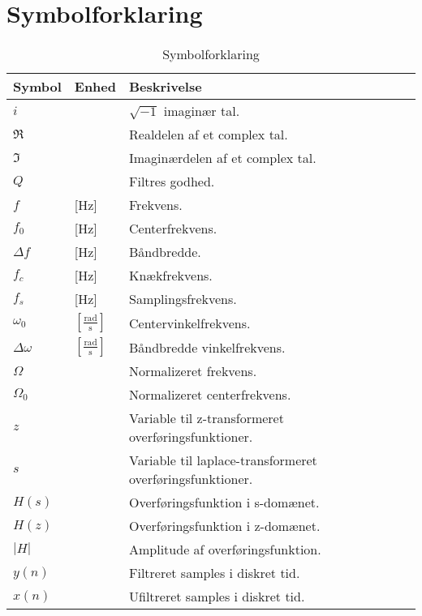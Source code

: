 \chapter{Symbolforklaring} \label{bilag:symbol}

\begin{table}[h!]
\centering
\caption{Symbolforklaring}
\label{tab:symboler}
\begin{threeparttable}
\begin{tabular}{l l l}
\toprule
\multicolumn{1}{l}{Symbol}       &
\multicolumn{1}{l}{Enhed}        &
\multicolumn{1}{l}{Beskrivelse}  \\ 
\midrule
$i$\tnote{*}		&					& $\sqrt{-1}$ imaginær tal.	\\
$\Re$\tnote{*}		&					& Realdelen af et complex tal.	\\
$\Im$\tnote{*}		&					& Imaginærdelen af et complex tal.	\\
$Q$\tnote{*}        &                   & Filtres godhed.\\
$f$					&	[\si{\hertz}]	& Frekvens.	\\
$f_0$				&	[\si{\hertz}]	& Centerfrekvens.	\\
$\Delta f$			&	[\si{\hertz}]	& Båndbredde.	\\
$f_c$				&	[\si{\hertz}]	& Knækfrekvens.	\\
$f_s$				&	[\si{\hertz}]	& Samplingsfrekvens.	\\
$\omega_0$			&	$[\frac{\si{\radian}}{\si{\second}}]$	& Centervinkelfrekvens.	\\
$\Delta \omega$		&	$[\frac{\si{\radian}}{\si{\second}}]$	& Båndbredde vinkelfrekvens.	\\
$\Omega$\tnote{*}	&					& Normalizeret frekvens.	\\
$\Omega_0$\tnote{*}	&					& Normalizeret centerfrekvens.	\\
$z$\tnote{*}		&					& Variable til z-transformeret overføringsfunktioner.\\
$s$\tnote{*}		&					& Variable til laplace-transformeret overføringsfunktioner.\\
$H(s)$\tnote{*}	    &		            & Overføringsfunktion i s-domænet.	\\
$H(z)$\tnote{*}	    &		            & Overføringsfunktion i z-domænet.	\\
$|H|$\tnote{*}	    &		            & Amplitude af overføringsfunktion.	\\
$y(n)$\tnote{*}	    &		            & Filtreret samples i diskret tid.	\\
$x(n)$\tnote{*}	    &		            & Ufiltreret samples i diskret tid.	\\

\end{tabular}
\end{threeparttable}
\end{table}
